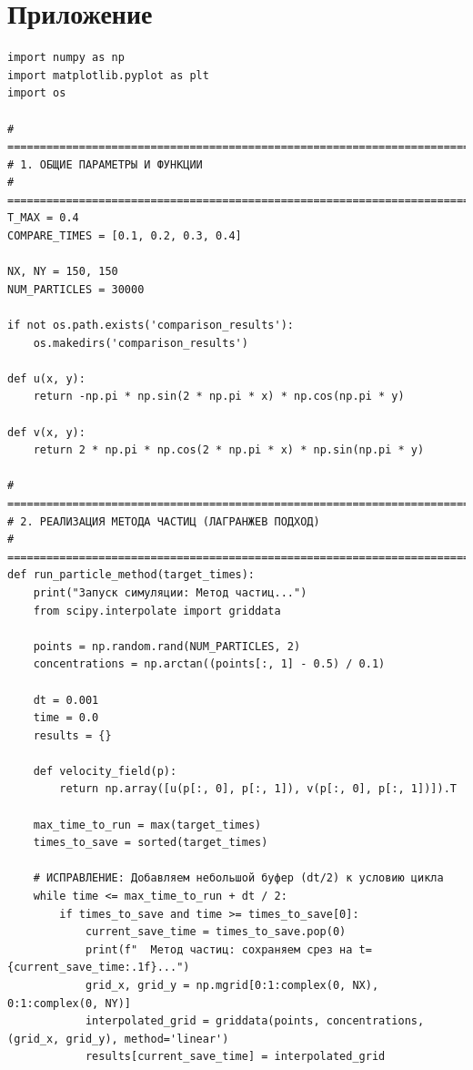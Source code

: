 \documentclass[a4paper,12pt]{article}
\begin{document}
\newpage

\section{Приложение}

\begin{verbatim}
import numpy as np
import matplotlib.pyplot as plt
import os

# =============================================================================
# 1. ОБЩИЕ ПАРАМЕТРЫ И ФУНКЦИИ
# =============================================================================
T_MAX = 0.4
COMPARE_TIMES = [0.1, 0.2, 0.3, 0.4]

NX, NY = 150, 150
NUM_PARTICLES = 30000

if not os.path.exists('comparison_results'):
    os.makedirs('comparison_results')

def u(x, y):
    return -np.pi * np.sin(2 * np.pi * x) * np.cos(np.pi * y)

def v(x, y):
    return 2 * np.pi * np.cos(2 * np.pi * x) * np.sin(np.pi * y)

# =============================================================================
# 2. РЕАЛИЗАЦИЯ МЕТОДА ЧАСТИЦ (ЛАГРАНЖЕВ ПОДХОД)
# =============================================================================
def run_particle_method(target_times):
    print("Запуск симуляции: Метод частиц...")
    from scipy.interpolate import griddata

    points = np.random.rand(NUM_PARTICLES, 2)
    concentrations = np.arctan((points[:, 1] - 0.5) / 0.1)
    
    dt = 0.001
    time = 0.0
    results = {}
    
    def velocity_field(p):
        return np.array([u(p[:, 0], p[:, 1]), v(p[:, 0], p[:, 1])]).T

    max_time_to_run = max(target_times)
    times_to_save = sorted(target_times)
    
    # ИСПРАВЛЕНИЕ: Добавляем небольшой буфер (dt/2) к условию цикла
    while time <= max_time_to_run + dt / 2:
        if times_to_save and time >= times_to_save[0]:
            current_save_time = times_to_save.pop(0)
            print(f"  Метод частиц: сохраняем срез на t={current_save_time:.1f}...")
            grid_x, grid_y = np.mgrid[0:1:complex(0, NX), 0:1:complex(0, NY)]
            interpolated_grid = griddata(points, concentrations, (grid_x, grid_y), method='linear')
            results[current_save_time] = interpolated_grid
        

\end{verbatim}
\end{document}
